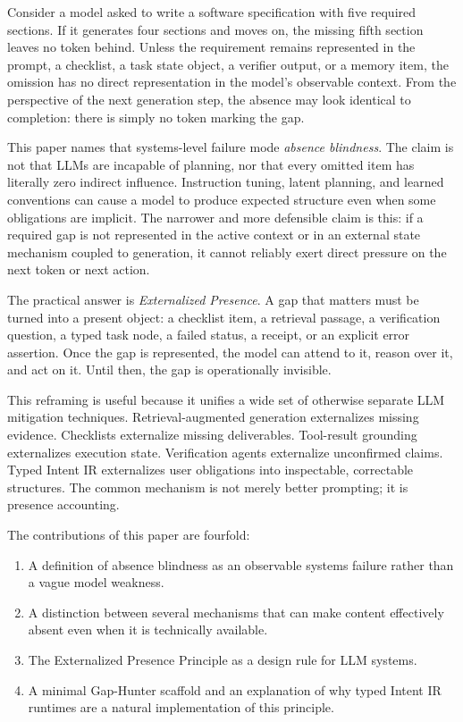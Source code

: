 \documentclass[10pt,conference]{IEEEtran}
\begin{document}
Consider a model asked to write a software specification with five required sections. If it generates four sections and moves on, the missing fifth section leaves no token behind. Unless the requirement remains represented in the prompt, a checklist, a task state object, a verifier output, or a memory item, the omission has no direct representation in the model's observable context. From the perspective of the next generation step, the absence may look identical to completion: there is simply no token marking the gap.

This paper names that systems-level failure mode \emph{absence blindness}. The claim is not that LLMs are incapable of planning, nor that every omitted item has literally zero indirect influence. Instruction tuning, latent planning, and learned conventions can cause a model to produce expected structure even when some obligations are implicit. The narrower and more defensible claim is this: if a required gap is not represented in the active context or in an external state mechanism coupled to generation, it cannot reliably exert direct pressure on the next token or next action.

The practical answer is \emph{Externalized Presence}. A gap that matters must be turned into a present object: a checklist item, a retrieval passage, a verification question, a typed task node, a failed status, a receipt, or an explicit error assertion. Once the gap is represented, the model can attend to it, reason over it, and act on it. Until then, the gap is operationally invisible.

This reframing is useful because it unifies a wide set of otherwise separate LLM mitigation techniques. Retrieval-augmented generation externalizes missing evidence. Checklists externalize missing deliverables. Tool-result grounding externalizes execution state. Verification agents externalize unconfirmed claims. Typed Intent IR externalizes user obligations into inspectable, correctable structures. The common mechanism is not merely better prompting; it is presence accounting.

The contributions of this paper are fourfold:
\begin{enumerate}
\item A definition of absence blindness as an observable systems failure rather than a vague model weakness.
\item A distinction between several mechanisms that can make content effectively absent even when it is technically available.
\item The Externalized Presence Principle as a design rule for LLM systems.
\item A minimal Gap-Hunter scaffold and an explanation of why typed Intent IR runtimes are a natural implementation of this principle.
\end{enumerate}
\end{document}
